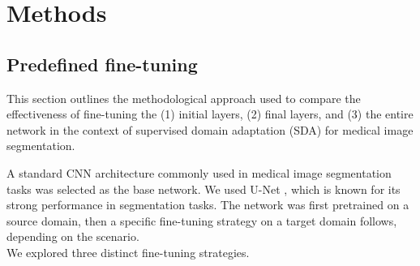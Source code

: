 \section{Methods}


\subsection{Predefined fine-tuning}
\label{sec:mri:method:sft}

This section outlines the methodological approach used to compare the effectiveness of fine-tuning the (1) initial layers, (2) final layers, and (3) the entire network in the context of supervised domain adaptation (SDA) for medical image segmentation.

A standard CNN architecture commonly used in medical image segmentation tasks was selected as the base network. We used U-Net \cite{ronneberger2015u}, which is known for its strong performance in segmentation tasks. The network was first pretrained on a source domain, then a specific fine-tuning strategy on a target domain follows, depending on the scenario.\\

We explored three distinct fine-tuning strategies.

